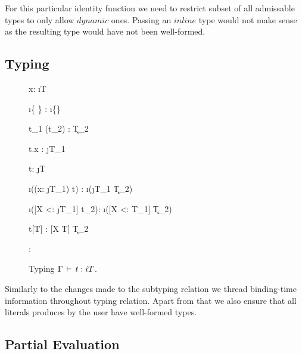 For this particular identity function we need to restrict subset of all admissable
types to only allow $dynamic$ ones. Passing an $inline$ type would not make sense
as the resulting type would have not been well-formed.

\subsection{Typing}

\begin{figure}[H]
  {\Gamma \ts x: \i{T}}

  {\Gamma \ts \i{\{  \}} : \i{\{\}}}

  {\Gamma \ts t_1 (t_2) : \k{T_2}}

  {\Gamma \ts t.x : \j{T_1}}

  {\Gamma \ts t: \j{T}}

  {\Gamma \ts \i{((x: \j{T_1}) \ra t)} : \i{(\j{T_1} \ra \k{T_2})}}

  {\Gamma \ts \i([X <: \j{T_1}] \ra t_2): \i{([X <: T_1] \ra \k{T_2})}}

  {\Gamma \ts t[T] : [X \mapsto T] \k{T_2}}

  {\Gamma \ts {} : }
\caption{Typing $\Gamma \,\vdash\, t: i T$.}
\end{figure}

Similarly to the changes made to the subtyping relation we thread binding-time information
throughout typing relation. Apart from that we also ensure that all literals produces by the
user have well-formed types.

\subsection{Partial Evaluation}

